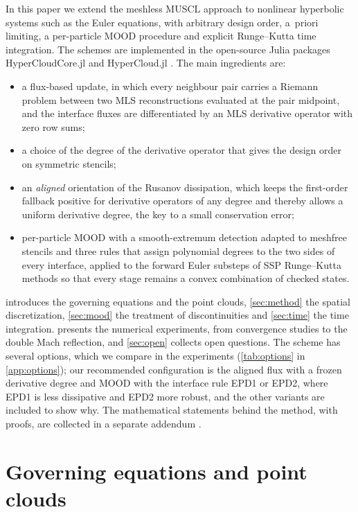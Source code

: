 \documentclass[11pt,a4paper]{article}
\numberwithin{equation}{section}
\begin{document}
In this paper we extend the meshless MUSCL approach to nonlinear hyperbolic systems such as the Euler equations, with arbitrary design order, a~priori limiting, a per-particle MOOD procedure and explicit Runge--Kutta time integration. The schemes are implemented in the open-source Julia packages HyperCloudCore.jl and HyperCloud.jl \cite{jung_hypercloudcore,jung_hypercloud}. The main ingredients are:
\begin{itemize}
\item a flux-based update, in which every neighbour pair carries a Riemann problem between two MLS reconstructions evaluated at the pair midpoint, and the interface fluxes are differentiated by an MLS derivative operator with zero row sums;
\item a choice of the degree of the derivative operator that gives the design order on symmetric stencils;
\item an \emph{aligned} orientation of the Rusanov dissipation, which keeps the first-order fallback positive for derivative operators of any degree and thereby allows a uniform derivative degree, the key to a small conservation error;
\item per-particle MOOD with a smooth-extremum detection adapted to meshfree stencils and three rules that assign polynomial degrees to the two sides of every interface, applied to the forward Euler substeps of SSP Runge--Kutta methods so that every stage remains a convex combination of checked states.
\end{itemize}
 introduces the governing equations and the point clouds, \cref{sec:method} the spatial discretization, \cref{sec:mood} the treatment of discontinuities and \cref{sec:time} the time integration.  presents the numerical experiments, from convergence studies to the double Mach reflection, and \cref{sec:open} collects open questions. The scheme has several options, which we compare in the experiments (\cref{tab:options} in \cref{app:options}); our recommended configuration is the aligned flux with a frozen derivative degree and MOOD with the interface rule EPD1 or EPD2, where EPD1 is less dissipative and EPD2 more robust, and the other variants are included to show why. The mathematical statements behind the method, with proofs, are collected in a separate addendum \cite{JungAddendum2026}.

\section{Governing equations and point clouds}\label{sec:setting}
\end{document}
